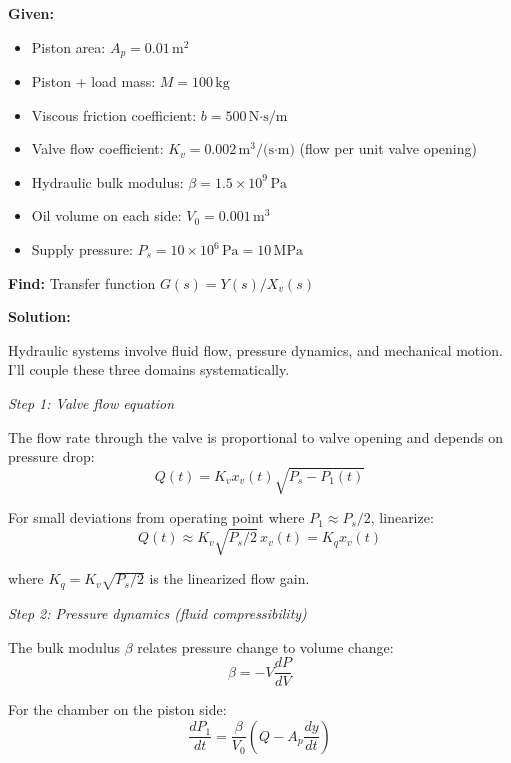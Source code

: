 \begin{example}
\textbf{Given:}
\begin{itemize}
    \item Piston area: $A_p = 0.01\,\text{m}^2$
    \item Piston + load mass: $M = 100\,\text{kg}$
    \item Viscous friction coefficient: $b = 500\,\text{N·s/m}$
    \item Valve flow coefficient: $K_v = 0.002\,\text{m}^3/\text{(s·m)}$ (flow per unit valve opening)
    \item Hydraulic bulk modulus: $\beta = 1.5 \times 10^9\,\text{Pa}$
    \item Oil volume on each side: $V_0 = 0.001\,\text{m}^3$
    \item Supply pressure: $P_s = 10 \times 10^6\,\text{Pa} = 10\,\text{MPa}$
\end{itemize}

\textbf{Find:} Transfer function $G(s) = Y(s)/X_v(s)$

\textbf{Solution:}

Hydraulic systems involve fluid flow, pressure dynamics, and mechanical motion. I'll couple these three domains systematically.

\textit{Step 1: Valve flow equation}

The flow rate through the valve is proportional to valve opening and depends on pressure drop:
\begin{equation}
Q(t) = K_v x_v(t) \sqrt{P_s - P_1(t)}
\end{equation}

For small deviations from operating point where $P_1 \approx P_s/2$, linearize:
\begin{equation}
Q(t) \approx K_v \sqrt{P_s/2} \, x_v(t) = K_q x_v(t)
\end{equation}

where $K_q = K_v\sqrt{P_s/2}$ is the linearized flow gain.

\textit{Step 2: Pressure dynamics (fluid compressibility)}

The bulk modulus $\beta$ relates pressure change to volume change:
\begin{equation}
\beta = -V \frac{dP}{dV}
\end{equation}

For the chamber on the piston side:
\begin{equation}
\frac{dP_1}{dt} = \frac{\beta}{V_0}\left(Q - A_p \frac{dy}{dt}\right)
\end{equation}


\end{example}
